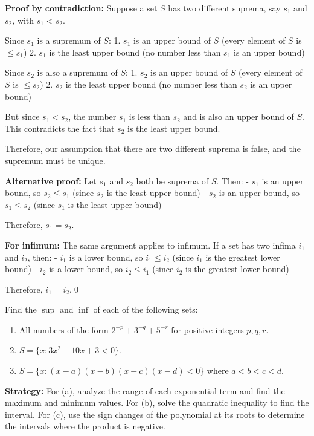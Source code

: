 \textbf{Proof by contradiction:}
Suppose a set $S$ has two different suprema, say $s_1$ and $s_2$, with $s_1 < s_2$.

Since $s_1$ is a supremum of $S$:
1. $s_1$ is an upper bound of $S$ (every element of $S$ is $\leq s_1$)
2. $s_1$ is the least upper bound (no number less than $s_1$ is an upper bound)

Since $s_2$ is also a supremum of $S$:
1. $s_2$ is an upper bound of $S$ (every element of $S$ is $\leq s_2$)
2. $s_2$ is the least upper bound (no number less than $s_2$ is an upper bound)

But since $s_1 < s_2$, the number $s_1$ is less than $s_2$ and is also an upper bound of $S$. This contradicts the fact that $s_2$ is the least upper bound.

Therefore, our assumption that there are two different suprema is false, and the supremum must be unique.

\textbf{Alternative proof:}
Let $s_1$ and $s_2$ both be suprema of $S$. Then:
- $s_1$ is an upper bound, so $s_2 \leq s_1$ (since $s_2$ is the least upper bound)
- $s_2$ is an upper bound, so $s_1 \leq s_2$ (since $s_1$ is the least upper bound)

Therefore, $s_1 = s_2$.

\textbf{For infimum:}
The same argument applies to infimum. If a set has two infima $i_1$ and $i_2$, then:
- $i_1$ is a lower bound, so $i_1 \leq i_2$ (since $i_1$ is the greatest lower bound)
- $i_2$ is a lower bound, so $i_2 \leq i_1$ (since $i_2$ is the greatest lower bound)

Therefore, $i_1 = i_2$.\qed


\begin{problembox}
Find the $\sup$ and $\inf$ of each of the following sets:
\begin{enumerate}[label=(\alph*)]
\item All numbers of the form $2^{-p} + 3^{-q} + 5^{-r}$ for positive integers $p, q, r$.
\item $S = \{x : 3x^2 - 10x + 3 < 0\}$.
\item $S = \{x : (x - a)(x - b)(x - c)(x - d) < 0\}$ where $a < b < c < d$.
\end{enumerate}
\end{problembox}

\noindent\textbf{Strategy:} For (a), analyze the range of each exponential term and find the maximum and minimum values. For (b), solve the quadratic inequality to find the interval. For (c), use the sign changes of the polynomial at its roots to determine the intervals where the product is negative.

